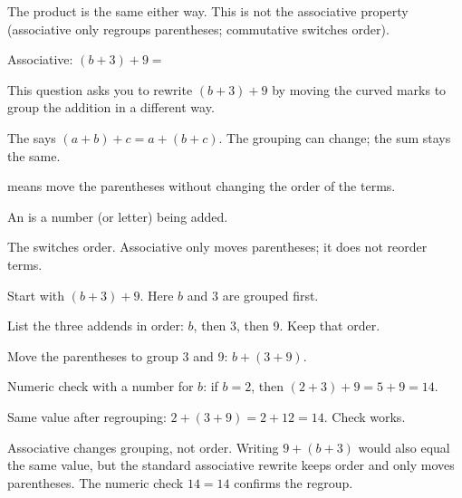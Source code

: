 
The product is the same either way. This is not the associative property (associative only regroups parentheses; commutative switches order).


Associative: $(b + 3) + 9 = $\ansblank


This question asks you to rewrite $(b + 3) + 9$ by moving the curved marks to group the addition in a different way.

\begin{words}
  \item The says $(a + b) + c = a + (b + c)$. The grouping can change; the sum stays the same.
  \item {}means move the parentheses without changing the order of the terms.
  \item An is a number (or letter) being added.
  \item The switches order. Associative only moves parentheses; it does not reorder terms.
\end{words}

\begin{steps}
  \item Start with $(b + 3) + 9$. Here $b$ and 3 are grouped first.
  \item List the three addends in order: $b$, then 3, then 9. Keep that order.
  \item Move the parentheses to group 3 and 9: $b + (3 + 9)$.
  \item Numeric check with a number for $b$: if $b = 2$, then $(2 + 3) + 9 = 5 + 9 = 14$.
  \item Same value after regrouping: $2 + (3 + 9) = 2 + 12 = 14$. Check works.
\end{steps}


Associative changes grouping, not order. Writing $9 + (b+3)$ would also equal the same value, but the standard associative rewrite keeps order and only moves parentheses. The numeric check $14 = 14$ confirms the regroup.


